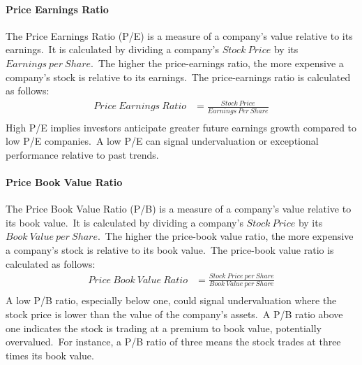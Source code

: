 \documentclass[../xlapes02]{subfiles}
\begin{document}
    \paragraph{Price Earnings Ratio}\label{par:price-earnings-ratio}
    The Price Earnings Ratio (P/E) is a measure of a company's value relative to its earnings.\ It is calculated by dividing a company's $Stock\ Price$ by its $Earnings\ per\ Share$.\ The higher the price-earnings ratio, the more expensive a company's stock is relative to its earnings.\ The price-earnings ratio is calculated as follows:
    \begin{equation}
        \label{eq:price-earnings-ratio}
        \begin{split}
            Price\ Earnings\ Ratio&=\frac{Stock\ Price}{Earnings\ Per\ Share}\\
        \end{split}
    \end{equation}
    High P/E implies investors anticipate greater future earnings growth compared to low P/E companies.\ A low P/E can signal undervaluation or exceptional performance relative to past trends.

    \paragraph{Price Book Value Ratio}\label{par:price-book-value-ratio}
    The Price Book Value Ratio (P/B) is a measure of a company's value relative to its book value.\ It is calculated by dividing a company's $Stock\ Price$ by its $Book\ Value\ per\ Share$.\ The higher the price-book value ratio, the more expensive a company's stock is relative to its book value.\ The price-book value ratio is calculated as follows:
    \begin{equation}
        \label{eq:price-book-value-ratio}
        \begin{split}
            Price\ Book\ Value\ Ratio&=\frac{Stock\ Price\ per\ Share}{Book\ Value\ per\ Share}\\
        \end{split}
    \end{equation}
    A low P/B ratio, especially below one, could signal undervaluation where the stock price is lower than the value of the company's assets.\ A P/B ratio above one indicates the stock is trading at a premium to book value, potentially overvalued.\ For instance, a P/B ratio of three means the stock trades at three times its book value.
\end{document}
